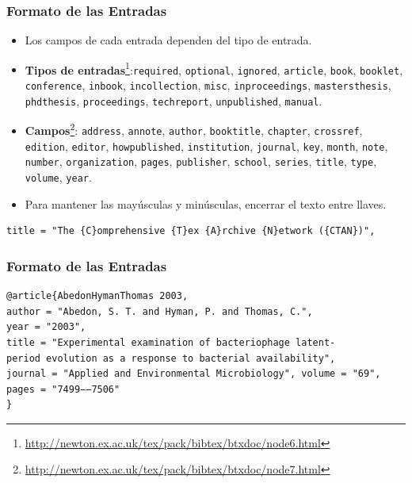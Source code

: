 \documentclass[aspectratio=1610]{beamer}%
\begin{document}
\begin{frame}[fragile]
\frametitle{\textbf{Formato de las Entradas}}
\justifying
 \begin{itemize}\justifying
  \item Los campos de cada entrada dependen del tipo de entrada.
\pause  \item \textbf{Tipos de entradas}\footnote{\url{http://newton.ex.ac.uk/tex/pack/bibtex/btxdoc/node6.html}}:\texttt{required}, \texttt{optional}, \texttt{ignored}, \texttt{article}, \texttt{book}, \texttt{booklet}, \texttt{conference}, \texttt{inbook}, \texttt{incollection},  \texttt{misc}, \texttt{inproceedings},   \texttt{mastersthesis}, \texttt{phdthesis}, \texttt{proceedings}, \texttt{techreport}, \texttt{unpublished}, \texttt{manual}.
 \pause \item \textbf{Campos}\footnote{\url{http://newton.ex.ac.uk/tex/pack/bibtex/btxdoc/node7.html}}: \texttt{address}, \texttt{annote}, \texttt{author}, \texttt{booktitle}, \texttt{chapter}, \texttt{crossref}, \texttt{edition}, \texttt{editor}, \texttt{howpublished}, \texttt{institution}, \texttt{journal}, \texttt{key}, \texttt{month}, \texttt{note}, \texttt{number}, \texttt{organization}, \texttt{pages}, \texttt{publisher}, \texttt{school}, \texttt{series}, \texttt{title}, \texttt{type}, \texttt{volume}, \texttt{year}.
\pause  \item Para mantener las mayúsculas y minúsculas, encerrar el texto entre llaves.
\end{itemize}

\scriptsize
\begin{verbatim}
title = "The {C}omprehensive {T}ex {A}rchive {N}etwork ({CTAN})", 
\end{verbatim}
\end{frame}



\begin{frame}[fragile]
\frametitle{\textbf{Formato de las Entradas}}
\justifying
 \begin{exampleblock}{}
   \vspace{-0.7cm}
\begin{lstlisting}
@article{AbedonHymanThomas 2003,
author = "Abedon, S. T. and Hyman, P. and Thomas, C.",
year = "2003",
title = "Experimental examination of bacteriophage latent-
period evolution as a response to bacterial availability",
journal = "Applied and Environmental Microbiology", volume = "69",
pages = "7499−−7506"
}
\end{lstlisting}\vspace{-0.3cm}
\end{exampleblock}
\end{frame}
\end{document}
